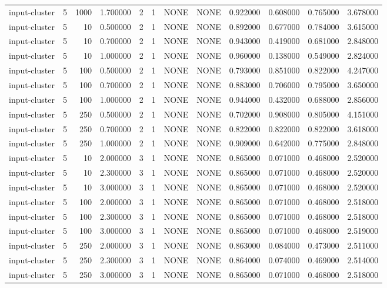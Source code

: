 \begin{tabular}{lrrrllllrrrr}
input-cluster & 5 & 1000 & 1.700000 & 2 & 1 & NONE & NONE & 0.922000 & 0.608000 & 0.765000 & 3.678000 \\
input-cluster & 5 & 10 & 0.500000 & 2 & 1 & NONE & NONE & 0.892000 & 0.677000 & 0.784000 & 3.615000 \\
input-cluster & 5 & 10 & 0.700000 & 2 & 1 & NONE & NONE & 0.943000 & 0.419000 & 0.681000 & 2.848000 \\
input-cluster & 5 & 10 & 1.000000 & 2 & 1 & NONE & NONE & 0.960000 & 0.138000 & 0.549000 & 2.824000 \\
input-cluster & 5 & 100 & 0.500000 & 2 & 1 & NONE & NONE & 0.793000 & 0.851000 & 0.822000 & 4.247000 \\
input-cluster & 5 & 100 & 0.700000 & 2 & 1 & NONE & NONE & 0.883000 & 0.706000 & 0.795000 & 3.650000 \\
input-cluster & 5 & 100 & 1.000000 & 2 & 1 & NONE & NONE & 0.944000 & 0.432000 & 0.688000 & 2.856000 \\
input-cluster & 5 & 250 & 0.500000 & 2 & 1 & NONE & NONE & 0.702000 & 0.908000 & 0.805000 & 4.151000 \\
input-cluster & 5 & 250 & 0.700000 & 2 & 1 & NONE & NONE & 0.822000 & 0.822000 & 0.822000 & 3.618000 \\
input-cluster & 5 & 250 & 1.000000 & 2 & 1 & NONE & NONE & 0.909000 & 0.642000 & 0.775000 & 2.848000 \\
input-cluster & 5 & 10 & 2.000000 & 3 & 1 & NONE & NONE & 0.865000 & 0.071000 & 0.468000 & 2.520000 \\
input-cluster & 5 & 10 & 2.300000 & 3 & 1 & NONE & NONE & 0.865000 & 0.071000 & 0.468000 & 2.520000 \\
input-cluster & 5 & 10 & 3.000000 & 3 & 1 & NONE & NONE & 0.865000 & 0.071000 & 0.468000 & 2.520000 \\
input-cluster & 5 & 100 & 2.000000 & 3 & 1 & NONE & NONE & 0.865000 & 0.071000 & 0.468000 & 2.518000 \\
input-cluster & 5 & 100 & 2.300000 & 3 & 1 & NONE & NONE & 0.865000 & 0.071000 & 0.468000 & 2.518000 \\
input-cluster & 5 & 100 & 3.000000 & 3 & 1 & NONE & NONE & 0.865000 & 0.071000 & 0.468000 & 2.519000 \\
input-cluster & 5 & 250 & 2.000000 & 3 & 1 & NONE & NONE & 0.863000 & 0.084000 & 0.473000 & 2.511000 \\
input-cluster & 5 & 250 & 2.300000 & 3 & 1 & NONE & NONE & 0.864000 & 0.074000 & 0.469000 & 2.514000 \\
input-cluster & 5 & 250 & 3.000000 & 3 & 1 & NONE & NONE & 0.865000 & 0.071000 & 0.468000 & 2.518000 \\

\end{tabular}
